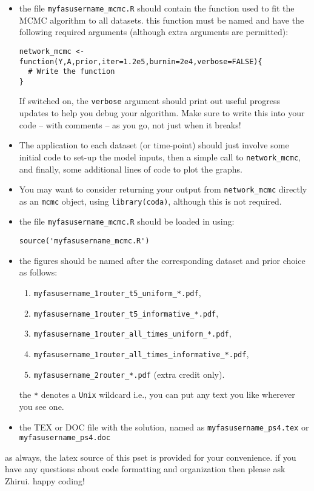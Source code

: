 \documentclass[11pt]{article}
\begin{document}
\begin{itemize}
\item the file \texttt{myfasusername\_mcmc.R} should contain the function used to fit the MCMC algorithm to all datasets. this function must be named and have the following required arguments (although extra arguments are permitted):
\begin{verbatim}
network_mcmc <- function(Y,A,prior,iter=1.2e5,burnin=2e4,verbose=FALSE){ 
  # Write the function 
}
\end{verbatim}
If switched on, the \texttt{verbose} argument should print out useful progress updates to help you debug your algorithm. Make sure to write this into your code -- with comments -- as you go, not just when it breaks!
\item The application to each dataset (or time-point) should just involve some initial code to set-up the model inputs, then a simple call to \texttt{network\_mcmc}, and finally, some additional lines of code to plot the graphs.
\item You may want to consider returning your output from \texttt{network\_mcmc} directly as an \texttt{mcmc} object, using \texttt{library(coda)}, although this is not required.
\item the file \texttt{myfasusername\_mcmc.R} should be loaded in using:
\begin{verbatim}
source('myfasusername_mcmc.R')
\end{verbatim}
\item the figures should be named after the corresponding dataset and prior choice as follows:
\begin{enumerate}
\item \texttt{myfasusername\_1router\_t5\_uniform\_*.pdf}, 
\item \texttt{myfasusername\_1router\_t5\_informative\_*.pdf},
\item \texttt{myfasusername\_1router\_all\_times\_uniform\_*.pdf}, 
\item \texttt{myfasusername\_1router\_all\_times\_informative\_*.pdf},
\item \texttt{myfasusername\_2router\_*.pdf} (extra credit only).
\end{enumerate}
the \texttt{*} denotes a \texttt{Unix} wildcard i.e., you can put any text you like wherever you see one.
\item the TEX or DOC file with the solution, named as \texttt{myfasusername\_ps4.tex} or \texttt{myfasusername\_ps4.doc}
\end{itemize}
as always, the latex source of this pset is provided for your convenience. if you have any questions about code formatting and organization then please ask Zhirui. happy coding! 
\end{document}
